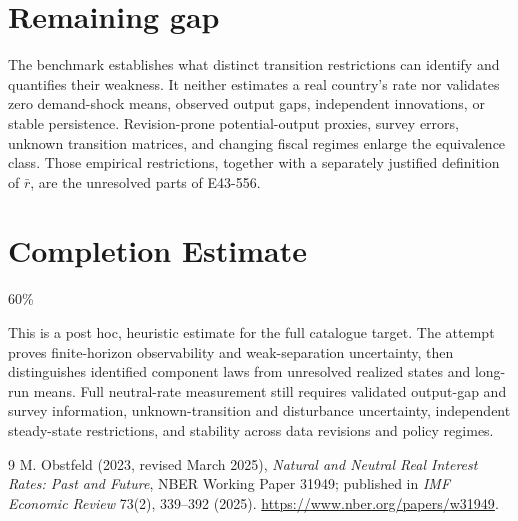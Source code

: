 \documentclass[11pt]{article}
\theoremstyle{definition}
\begin{document}
\section*{Remaining gap}
The benchmark establishes what distinct transition restrictions can identify and quantifies their weakness. It neither estimates a real country's rate nor validates zero demand-shock means, observed output gaps, independent innovations, or stable persistence. Revision-prone potential-output proxies, survey errors, unknown transition matrices, and changing fiscal regimes enlarge the equivalence class. Those empirical restrictions, together with a separately justified definition of $\bar r$, are the unresolved parts of E43-556.

\section{Completion Estimate}
60\%

This is a post hoc, heuristic estimate for the full catalogue target.
The attempt proves finite-horizon observability and weak-separation uncertainty, then distinguishes identified component laws from unresolved realized states and long-run means. Full neutral-rate measurement still requires validated output-gap and survey information, unknown-transition and disturbance uncertainty, independent steady-state restrictions, and stability across data revisions and policy regimes.

\begin{thebibliography}{9}
 M. Obstfeld (2023, revised March 2025), \emph{Natural and Neutral Real Interest Rates: Past and Future}, NBER Working Paper 31949; published in \emph{IMF Economic Review} 73(2), 339--392 (2025). \url{https://www.nber.org/papers/w31949}.
\end{thebibliography}
\end{document}
